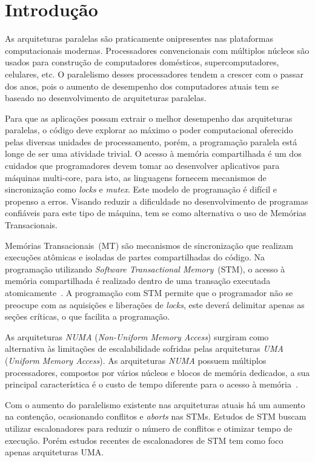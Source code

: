 \documentclass[ti]{texufpel}
\begin{document}
\tableofcontents

\chapter{Introdução}

As arquiteturas paralelas são praticamente onipresentes nas plataformas computacionais modernas. Processadores convencionais com múltiplos núcleos são usados para construção de computadores domésticos, supercomputadores, celulares, etc. O paralelismo desses processadores tendem a crescer com o passar dos anos, pois o aumento de desempenho dos computadores atuais tem se baseado no desenvolvimento de arquiteturas paralelas.

Para que as aplicações possam extrair o melhor desempenho das arquiteturas paralelas, o código deve explorar ao máximo o poder computacional oferecido pelas diversas unidades de processamento, porém, a programação paralela está longe de ser uma atividade trivial. O acesso à memória compartilhada é um dos cuidados que programadores devem tomar ao desenvolver aplicativos para máquinas multi-core, para isto, as linguagens fornecem mecanismos de sincronização como \emph{locks} e \emph{mutex}. Este modelo de programação é difícil e propenso a erros. Visando reduzir a dificuldade no desenvolvimento de programas confiáveis para este tipo de máquina, tem se como alternativa o uso de Memórias Transacionais.

Memórias Transacionais~(MT) são mecanismos de sincronização que realizam execuções atômicas e isoladas de partes compartilhadas do código. Na programação utilizando \emph{Software Transactional Memory}~(STM), o acesso à memória compartilhada é realizado dentro de uma transação executada atomicamente~\cite{teixeira15}. A programação com STM permite que o programador não se preocupe com as aquisições e liberações de \emph{locks}, este deverá delimitar apenas as seções críticas, o que facilita a programação.

As arquiteturas \emph{NUMA} (\emph{Non-Uniform Memory Access}) surgiram como alternativa às limitações de escalabilidade sofridas pelas arquiteturas \emph{UMA} (\emph{Uniform Memory Access}). As arquiteturas \emph{NUMA} possuem múltiplos processadores, compostos por vários núcleos e blocos de memória dedicados, a sua principal característica é o custo de tempo diferente para o acesso à memória~\cite{rodolfo14}.

Com o aumento do paralelismo existente nas arquiteturas atuais há um aumento na contenção, ocasionando conflitos e \emph{aborts} nas STMs. Estudos de STM buscam utilizar escalonadores para reduzir o número de conflitos e otimizar tempo de execução. Porém estudos recentes de escalonadores de STM tem como foco apenas arquiteturas UMA.
\end{document}
